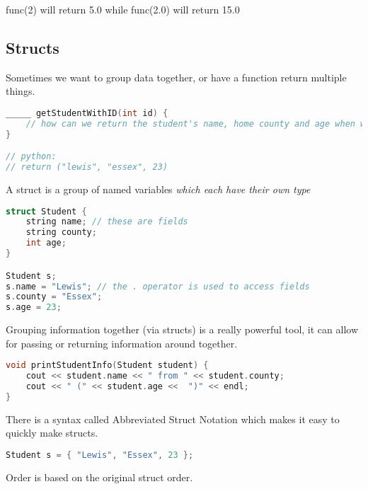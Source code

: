 \documentclass[]{article}
\begin{document}
\begin{answer}
func(2) will return 5.0 while func(2.0) will return 15.0
\end{answer}

\subsection{Structs}

Sometimes we want to group data together, or have a function return multiple things.

\begin{lstlisting}[language=C++]
_____ getStudentWithID(int id) {
    // how can we return the student's name, home county and age when we can only return one type?
}

// python:
// return ("lewis", "essex", 23)
\end{lstlisting}

\begin{definition}
    A struct is a group of named variables \emph{which each have their own type}
\end{definition}

\begin{lstlisting}[language=C++]
struct Student {
    string name; // these are fields
    string county;
    int age;
}

Student s;
s.name = "Lewis"; // the . operator is used to access fields
s.county = "Essex";
s.age = 23;
\end{lstlisting}

Grouping information together (via structs) is a really powerful tool, it can allow for passing or returning information around together.

\begin{lstlisting}[language=C++]
void printStudentInfo(Student student) {
    cout << student.name << " from " << student.county;
    cout << " (" << student.age <<  ")" << endl;
}
\end{lstlisting}

\begin{note}
There is a syntax called Abbreviated Struct Notation which makes it easy to quickly make structs.

\begin{lstlisting}[language=C++, numbers=none]
Student s = { "Lewis", "Essex", 23 };
\end{lstlisting}

Order is based on the original struct order.
\end{note}
\end{document}
